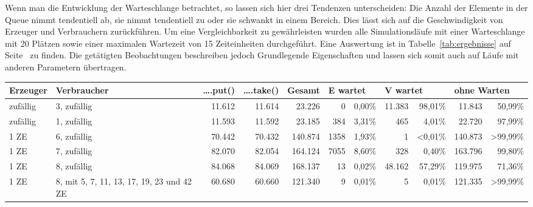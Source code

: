 Wenn man die Entwicklung der Warteschlange betrachtet, so lassen sich hier drei Tendenzen unterscheiden: Die Anzahl der Elemente in der Queue nimmt tendentiell ab, sie nimmt tendentiell zu oder sie schwankt in einem Bereich. Dies lässt sich auf die Geschwindigkeit von Erzeuger und Verbrauchern zurückführen. Um eine Vergleichbarkeit zu gewährleisten wurden alle Simulationsläufe mit einer Warteschlange mit 20 Plätzen sowie einer maximalen Wartezeit von 15 Zeiteinheiten durchgeführt. Eine Auswertung ist in Tabelle~\ref{tab:ergebnisse} auf Seite~\pageref{tab:ergebnisse} zu finden. Die getätigten Beobachtungen beschreiben jedoch Grundlegende Eigenschaften und lassen sich somit auch auf Läufe mit anderen Parametern übertragen.

\begin{landscape}
\begin{footnotesize}
\begin{table}[H]
\begin{center}
\begin{tabular}{| p{3cm} | p{3cm} || r | r | r | r r | r r | r r |}  \hline                       
  \textbf{Erzeuger}	& \textbf{Verbraucher}  & \textbf{….put()} & \textbf{….take()} & \textbf{Gesamt} & \multicolumn{2}{|l|}{\textbf{E wartet}} & \multicolumn{2}{|l|}{\textbf{V wartet}} & \multicolumn{2}{|l|}{\textbf{ohne Warten}}  \\ \hline 
zufällig 		& 3, zufällig & 11.612 			 & 11.614 			 & 23.226 		   & 0 		 & 0,00\% 						 & 11.383  & 98,01\% 					   & 11.843		&	50,99\%	\\ \hline
zufällig 		& 1, zufällig & 11.593		     & 11.592 			 & 23.185 		   & 384 	 & 3,31\% 						 & 465     &  4,01\% 					   & 22.720		&	97,99\%	\\ \hline
1 ZE 			& 6, zufällig & 70.442 	 	     & 70.432 			 & 140.874 		   & 1358 	 & 1,93\% 						 & 1       &  <0,01\% 					   & 140.873	&  >99,99\%	\\ \hline
1 ZE 			& 7, zufällig & 82.070 	 		 & 82.054 			 & 164.124 		   & 7055    & 8,60\% 						 & 328     & 0,40\% 					   & 163.796		&	99,80\%	\\ \hline
1 ZE 			& 8, zufällig & 84.068 	 		 & 84.069 			 & 168.137 		   & 13 	 & 0,02\% 						 & 48.162  & 57,29\% 					   & 119.975	&	71,36\%	\\ \hline
1 ZE & 8, mit 5, 7, 11, 13, 17, 19, 23 und 42 ZE & 60.680 & 60.660	 & 121.340 		   & 9 		 & 0,01\% 						 & 5  & 0,01\% 					   & 121.335		&	>99,99\%	\\ \hline
\end{tabular}

\end{center}
\end{table}
\end{footnotesize}
\end{landscape}
